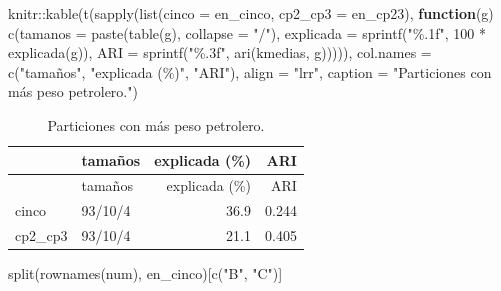 \documentclass[oneside, openany, fontset=libertinus]{mitthesis}
\newenvironment{Shaded}{\begin{snugshade}}{\end{snugshade}}
\newcommand{\AttributeTok}[1]{\textcolor[rgb]{0.40,0.45,0.13}{#1}}
\newcommand{\ControlFlowTok}[1]{\textcolor[rgb]{0.00,0.23,0.31}{\textbf{#1}}}
\newcommand{\DecValTok}[1]{\textcolor[rgb]{0.68,0.00,0.00}{#1}}
\newcommand{\FunctionTok}[1]{\textcolor[rgb]{0.28,0.35,0.67}{#1}}
\newcommand{\NormalTok}[1]{\textcolor[rgb]{0.00,0.23,0.31}{#1}}
\newcommand{\SpecialCharTok}[1]{\textcolor[rgb]{0.37,0.37,0.37}{#1}}
\newcommand{\StringTok}[1]{\textcolor[rgb]{0.13,0.47,0.30}{#1}}
\begin{document}
\Needspace{2.66in}

\begin{Shaded}
\begin{Highlighting}[]
\NormalTok{knitr}\SpecialCharTok{::}\FunctionTok{kable}\NormalTok{(}\FunctionTok{t}\NormalTok{(}\FunctionTok{sapply}\NormalTok{(}\FunctionTok{list}\NormalTok{(}\AttributeTok{cinco =}\NormalTok{ en\_cinco, }\AttributeTok{cp2\_cp3 =}\NormalTok{ en\_cp23),}
  \ControlFlowTok{function}\NormalTok{(g) }\FunctionTok{c}\NormalTok{(}\AttributeTok{tamanos =} \FunctionTok{paste}\NormalTok{(}\FunctionTok{table}\NormalTok{(g), }\AttributeTok{collapse =} \StringTok{"/"}\NormalTok{),}
    \AttributeTok{explicada =} \FunctionTok{sprintf}\NormalTok{(}\StringTok{"\%.1f"}\NormalTok{, }\DecValTok{100} \SpecialCharTok{*} \FunctionTok{explicada}\NormalTok{(g)),}
    \AttributeTok{ARI =} \FunctionTok{sprintf}\NormalTok{(}\StringTok{"\%.3f"}\NormalTok{, }\FunctionTok{ari}\NormalTok{(kmedias, g))))),}
  \AttributeTok{col.names =} \FunctionTok{c}\NormalTok{(}\StringTok{"tamaños"}\NormalTok{, }\StringTok{"explicada (\%)"}\NormalTok{, }\StringTok{"ARI"}\NormalTok{), }\AttributeTok{align =} \StringTok{"lrr"}\NormalTok{,}
  \AttributeTok{caption =} \StringTok{"Particiones con más peso petrolero."}\NormalTok{)}
\end{Highlighting}
\end{Shaded}

\Needspace{1.55in}

\begin{longtable}[]{@{}llrr@{}}
\caption{Particiones con más peso petrolero.}\tabularnewline
\toprule\noalign{}
& tamaños & explicada (\%) & ARI \\
\midrule\noalign{}
\endfirsthead
\toprule\noalign{}
& tamaños & explicada (\%) & ARI \\
\midrule\noalign{}
\endhead
\bottomrule\noalign{}
\endlastfoot
cinco & 93/10/4 & 36.9 & 0.244 \\
cp2\_cp3 & 93/10/4 & 21.1 & 0.405 \\
\end{longtable}

\Needspace{1.71in}

\begin{Shaded}
\begin{Highlighting}[]
\FunctionTok{split}\NormalTok{(}\FunctionTok{rownames}\NormalTok{(num), en\_cinco)[}\FunctionTok{c}\NormalTok{(}\StringTok{"B"}\NormalTok{, }\StringTok{"C"}\NormalTok{)]}
\end{Highlighting}
\end{Shaded}
\end{document}
